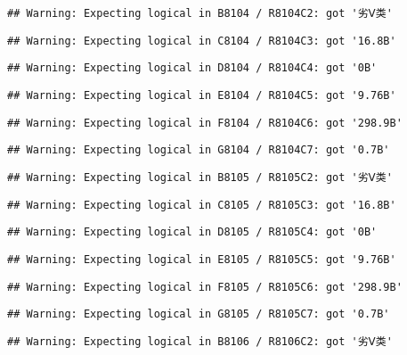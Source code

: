 \documentclass[
]{article}
\begin{document}
\begin{verbatim}
## Warning: Expecting logical in B8104 / R8104C2: got '劣Ⅴ类'
\end{verbatim}

\begin{verbatim}
## Warning: Expecting logical in C8104 / R8104C3: got '16.8B'
\end{verbatim}

\begin{verbatim}
## Warning: Expecting logical in D8104 / R8104C4: got '0B'
\end{verbatim}

\begin{verbatim}
## Warning: Expecting logical in E8104 / R8104C5: got '9.76B'
\end{verbatim}

\begin{verbatim}
## Warning: Expecting logical in F8104 / R8104C6: got '298.9B'
\end{verbatim}

\begin{verbatim}
## Warning: Expecting logical in G8104 / R8104C7: got '0.7B'
\end{verbatim}

\begin{verbatim}
## Warning: Expecting logical in B8105 / R8105C2: got '劣Ⅴ类'
\end{verbatim}

\begin{verbatim}
## Warning: Expecting logical in C8105 / R8105C3: got '16.8B'
\end{verbatim}

\begin{verbatim}
## Warning: Expecting logical in D8105 / R8105C4: got '0B'
\end{verbatim}

\begin{verbatim}
## Warning: Expecting logical in E8105 / R8105C5: got '9.76B'
\end{verbatim}

\begin{verbatim}
## Warning: Expecting logical in F8105 / R8105C6: got '298.9B'
\end{verbatim}

\begin{verbatim}
## Warning: Expecting logical in G8105 / R8105C7: got '0.7B'
\end{verbatim}

\begin{verbatim}
## Warning: Expecting logical in B8106 / R8106C2: got '劣Ⅴ类'
\end{verbatim}
\end{document}
